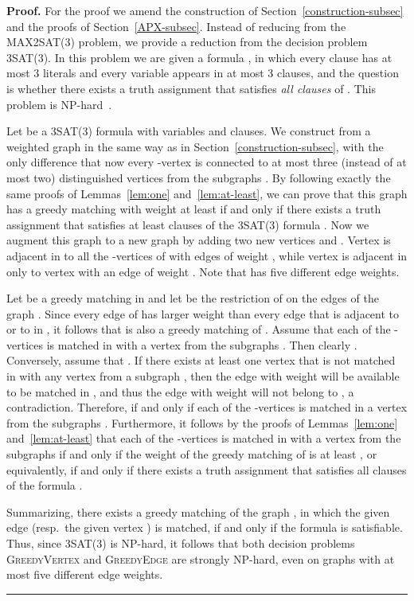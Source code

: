 \documentclass[a4paper,11pt]{article}
\newenvironment{proof}[1][Proof]{\noindent\textbf{#1.} }{\ \rule{0.5em}{0.5em}}
\newcommand{\greedyv}{\textsc{GreedyVertex}\xspace}
\newcommand{\greedye}{\textsc{GreedyEdge}\xspace}
\begin{document}
\begin{proof}
For the proof we amend the construction of Section~\ref{construction-subsec}
and the proofs of Section~\ref{APX-subsec}. Instead of reducing from the MAX2SAT(3) problem, 
we provide a reduction from the decision problem 3SAT(3). In this problem we are given a formula , 
in which every clause has at most 3 literals and every variable appears in at most 3 clauses, 
and the question is whether there exists a truth assignment that satisfies \emph{all clauses} of . 
This problem is NP-hard~\cite{Ausiello1999}. 


Let  be a 3SAT(3) formula with  variables and  clauses. We construct from  a weighted graph  in the same way as in Section~\ref{construction-subsec}, 
with the only difference that now every -vertex is connected to at most three (instead of at most two) distinguished vertices from the subgraphs . 
By following exactly the same proofs of Lemmas~\ref{lem:one} and~\ref{lem:at-least}, we can prove that this graph  has a greedy matching with weight at least  if and only if 
there exists a truth assignment that satisfies at least  clauses of the 3SAT(3) formula . 
Now we augment this graph  to a new graph  by adding two new vertices  and .
Vertex  is adjacent in  to all the -vertices of  with
edges of weight , while vertex  is adjacent in  only to vertex  with an edge of weight . Note
that  has five different edge weights.





Let  be a greedy matching in  and let  be the restriction of  on the edges of
the graph . Since every edge of  has larger weight than every edge
that is adjacent to  or to  in , it follows that  is also a greedy matching of . Assume that each of the  -vertices is matched in  with a vertex from the subgraphs . Then clearly . Conversely, assume that . If there
exists at least one vertex  that is not matched in  with
any vertex from a subgraph , then the edge  with weight  will be available to be matched in , and thus the edge  with weight  will not
belong to , a contradiction. Therefore,  if and only if each of the  -vertices is
matched in  a vertex from the subgraphs . Furthermore, it follows by the proofs of Lemmas~\ref{lem:one} and~\ref{lem:at-least} that each of the  -vertices is matched in  with a vertex from the subgraphs  if and only if
the weight of the greedy matching  of  is at least ,
or equivalently, if and only if there exists a truth assignment that
satisfies all  clauses of the formula .



Summarizing, there exists a greedy matching  of the
graph , in which the given edge  (resp.~the given
vertex ) is matched, if and only if the formula  is satisfiable. 
Thus, since 3SAT(3) is NP-hard, it follows that both decision problems \greedyv and \greedye 
are strongly NP-hard, even on graphs with at most five different edge weights.
\end{proof}
\end{document}
